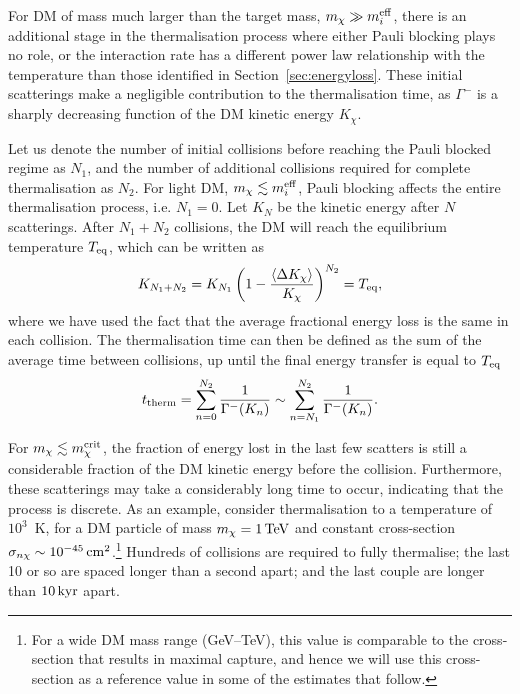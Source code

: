 For DM of mass much larger than the target mass, $m_\chi\gg m_i^{\rm eff}$, there is an additional stage in the thermalisation process where either Pauli blocking plays no role, or the interaction rate has a different power law relationship with the temperature than those identified in Section~\ref{sec:energyloss}. These initial scatterings make a negligible contribution to the thermalisation time, as  $\Gamma^{-}$ is a sharply decreasing function of the DM kinetic energy $K_\chi$. 

 
Let us denote the number of initial collisions before reaching the Pauli blocked regime as $N_1$, and the number of additional collisions required for complete thermalisation as $N_2$. For light DM, $m_\chi\lesssim m_i^{\rm eff}$, Pauli blocking affects the entire thermalisation process, i.e. $N_1=0$. Let $K_N$ be the kinetic energy after $N$ scatterings. After $N_1+N_2$ collisions, the DM will reach the equilibrium temperature $T_{\rm eq}$, which can be written as
\begin{equation}
K_{N_1+N_2} = 
K_{N_1}\left(1-\frac{\langle \Delta K_\chi \rangle}{K_\chi}\right)^{N_2} = T_{\rm eq},  
\label{ch6:eq:Teq}
\end{equation}
where we have used the fact that the average fractional energy loss is the same in each collision. 
The thermalisation time can then be defined as the sum of the average time between collisions, up until the final energy transfer is equal to $T_{\rm eq}$~\cite{Bertoni:2013bsa_dec_DarkMatterThermalization}
\begin{equation}
t_{\rm therm} = \sum_{n=0}^{N_2} \frac{1}{\Gamma^{-}(K_n)} \sim \sum_{n=N_1}^{N_2} \frac{1}{\Gamma^{-}(K_n)}.  
\label{ch6:eq:thermtime}
\end{equation}


For  $m_\chi \lesssim m_\chi^{\rm crit}$, the fraction of energy lost in the last few scatters is still a considerable fraction of the DM kinetic energy before the collision. Furthermore, these scatterings may take a considerably long time to occur, indicating that the process is discrete. 
As an example, consider thermalisation to a temperature of $10^3$~K, for a DM particle of mass $m_\chi=1{\rm \,TeV}$ and constant cross-section $\sigma_{n\chi} \sim 10^{-45}{\rm \,cm}^2$.\footnote{ For a wide DM mass range (GeV--TeV), this value is comparable to the cross-section that results in maximal capture, and hence we will use this cross-section as a reference value in some of the estimates that follow.} Hundreds of collisions are required to fully thermalise; the last 10 or so are spaced longer than a second apart; and the last couple are longer than $10 {\rm \,kyr}$ apart.    



